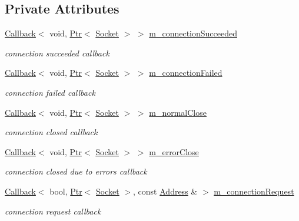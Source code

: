 \subsection*{Private Attributes}
\begin{DoxyCompactItemize}
\item 
\hyperlink{classns3_1_1Callback}{Callback}$<$ void, \hyperlink{classns3_1_1Ptr}{Ptr}$<$ \hyperlink{classns3_1_1Socket}{Socket} $>$ $>$ \hyperlink{classns3_1_1Socket_a77a74e2e90422f1685ca881513045412}{m\+\_\+connection\+Succeeded}
\begin{DoxyCompactList}\small\item\em connection succeeded callback \end{DoxyCompactList}\item 
\hyperlink{classns3_1_1Callback}{Callback}$<$ void, \hyperlink{classns3_1_1Ptr}{Ptr}$<$ \hyperlink{classns3_1_1Socket}{Socket} $>$ $>$ \hyperlink{classns3_1_1Socket_a3994b290c0db400f5e0f4f71b8e8b8dc}{m\+\_\+connection\+Failed}
\begin{DoxyCompactList}\small\item\em connection failed callback \end{DoxyCompactList}\item 
\hyperlink{classns3_1_1Callback}{Callback}$<$ void, \hyperlink{classns3_1_1Ptr}{Ptr}$<$ \hyperlink{classns3_1_1Socket}{Socket} $>$ $>$ \hyperlink{classns3_1_1Socket_a097d37abd77901b0b71f9c967f7f4dd8}{m\+\_\+normal\+Close}
\begin{DoxyCompactList}\small\item\em connection closed callback \end{DoxyCompactList}\item 
\hyperlink{classns3_1_1Callback}{Callback}$<$ void, \hyperlink{classns3_1_1Ptr}{Ptr}$<$ \hyperlink{classns3_1_1Socket}{Socket} $>$ $>$ \hyperlink{classns3_1_1Socket_afc3a4e8c5d4bd0de426197d4874dc8eb}{m\+\_\+error\+Close}
\begin{DoxyCompactList}\small\item\em connection closed due to errors callback \end{DoxyCompactList}\item 
\hyperlink{classns3_1_1Callback}{Callback}$<$ bool, \hyperlink{classns3_1_1Ptr}{Ptr}$<$ \hyperlink{classns3_1_1Socket}{Socket} $>$, const \hyperlink{classns3_1_1Address}{Address} \& $>$ \hyperlink{classns3_1_1Socket_afaf3b168b6508bbfd6812c277fe8adcf}{m\+\_\+connection\+Request}
\begin{DoxyCompactList}\small\item\em connection request callback \end{DoxyCompactList}\item 

\end{DoxyCompactItemize}
